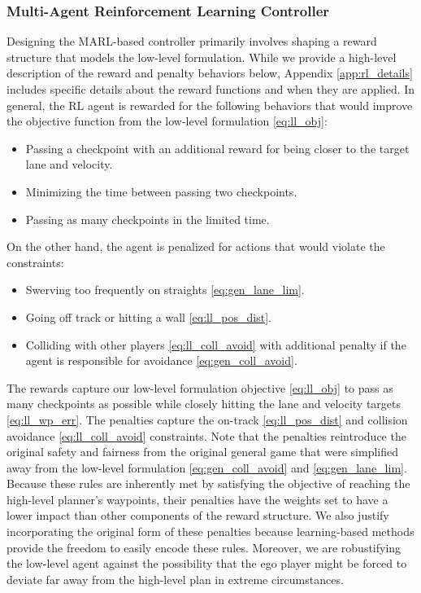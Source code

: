 \subsubsection{Multi-Agent Reinforcement Learning Controller}
Designing the MARL-based controller primarily involves shaping a reward structure that models the low-level formulation. While we provide a high-level description of the reward and penalty behaviors below, Appendix \ref{app:rl_details} includes specific details about the reward functions and when they are applied. In general, the RL agent is rewarded for the following behaviors that would improve the objective function from the low-level formulation \eqref{eq:ll_obj}:
\begin{itemize}
    \item Passing a checkpoint with an additional reward for being closer to the target lane and velocity.
    \item Minimizing the time between passing two checkpoints.
    \item Passing as many checkpoints in the limited time.
\end{itemize}
On the other hand, the agent is penalized for actions that would violate the constraints:
\begin{itemize}
    \item Swerving too frequently on straights \eqref{eq:gen_lane_lim}.
    \item Going off track or hitting a wall \eqref{eq:ll_pos_dist}.
    \item Colliding with other players \eqref{eq:ll_coll_avoid} with additional penalty if the agent is responsible for avoidance \eqref{eq:gen_coll_avoid}. 
\end{itemize}

The rewards capture our low-level formulation objective \eqref{eq:ll_obj} to pass as many checkpoints as possible while closely hitting the lane and velocity targets \eqref{eq:ll_wp_err}. The penalties capture the on-track \eqref{eq:ll_pos_dist} and collision avoidance \eqref{eq:ll_coll_avoid} constraints. Note that the penalties reintroduce the original safety and fairness from the original general game that were simplified away from the low-level formulation \eqref{eq:gen_coll_avoid} and \eqref{eq:gen_lane_lim}. Because these rules are inherently met by satisfying the objective of reaching the high-level planner's waypoints, their penalties have the weights set to have a lower impact than other components of the reward structure. We also justify incorporating the original form of these penalties because learning-based methods provide the freedom to easily encode these rules. Moreover, we are robustifying the low-level agent against the possibility that the ego player might be forced to deviate far away from the high-level plan in extreme circumstances.


